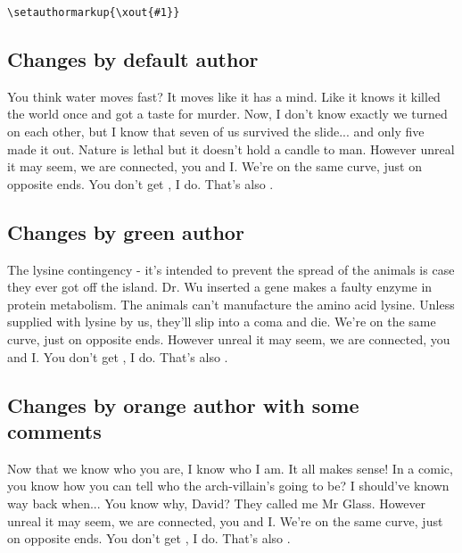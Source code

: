 \documentclass[11pt, a4paper, notitlepage, english]{article}
\begin{document}
\verb|\setauthormarkup{\xout{#1}}|









\subsection*{Changes by default author}

You think water moves fast?
It moves like it has a mind.
Like it knows it killed the world once and got a taste for murder.
Now, I don't know exactly  we turned on each other, but I know that seven of us survived the slide... and only five made it out.
Nature is lethal but it doesn't hold a candle to man.
However unreal it may seem, we are connected, you and I.
We're on the same curve, just on opposite ends.
You don't get , I do.
That's also .

\subsection*{Changes by green author}

The lysine contingency - it's intended to prevent the spread of the animals is case they ever got off the island.
Dr. Wu inserted a gene  makes a  faulty enzyme in protein metabolism.
The animals can't manufacture the amino acid lysine.
Unless  supplied with lysine by us, they'll slip into a coma and die.
We're on the same curve, just on opposite ends.
However unreal it may seem, we are connected, you and I.
You don't get , I do.
That's also .

\subsection*{Changes by orange author with some comments}

Now that we know who you are, I know who I am.
It all makes sense!
In a comic, you know how you can tell who the arch-villain's going to be?
I should've known way back when...
You know why, David?
They called me Mr Glass.
However unreal it may seem, we are connected, you and I.
We're on the same curve, just on opposite ends.
You don't get , I do.
That's also .
\end{document}
